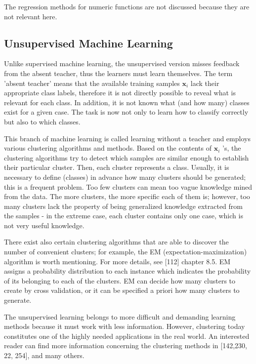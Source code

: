 \documentclass[11pt,openany,executivepaper]{book}
\begin{document}
The regression methods for numeric functions are not discussed because they are not relevant here.

\subsection{Unsupervised Machine Learning}
Unlike supervised machine learning, the unsupervised version misses feedback from the absent teacher, thus the learners must learn themselves. The term 'absent teacher' means that the available training samples $\mathbf{x}_{i}$ lack their appropriate class labels, therefore it is not directly possible to reveal what is relevant for each class. In addition, it is not known what (and how many) classes exist for a given case. The task is now not only to learn how to classify correctly but also to which classes.

This branch of machine learning is called learning without a teacher and employs various clustering algorithms and methods. Based on the contents of $\mathbf{x}_{i}$ 's, the clustering algorithms try to detect which samples are similar enough to establish their particular cluster. Then, each cluster represents a class. Usually, it is necessary to define (classes) in advance how many clusters should be generated; this is a frequent problem. Too few clusters can mean too vague knowledge mined from the data. The more clusters, the more specific each of them is; however, too many clusters lack the property of being generalized knowledge extracted from the samples - in the extreme case, each cluster contains only one case, which is not very useful knowledge.

There exist also certain clustering algorithms that are able to discover the number of convenient clusters; for example, the EM (expectati\-on-maximizati\-on) algorithm is worth mentioning. For more details, see [112] chapter 8.5. EM assigns a probability distribution to each instance which indicates the probability of its belonging to each of the clusters. EM can decide how many clusters to create by cross validation, or it can be specified a priori how many clusters to generate.

The unsupervised learning belongs to more difficult and demanding lear\-ning methods because it must work with less information. However, clustering today constitutes one of the highly needed applications in the real world. An interested reader can find more information concerning the clustering methods in [142,230, 22, 254], and many others.
\end{document}
